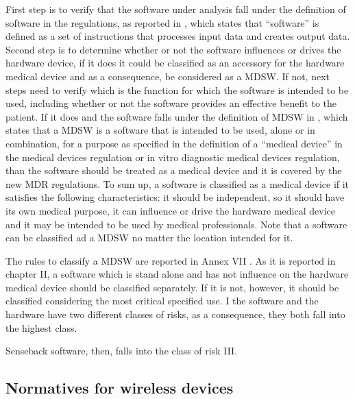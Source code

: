 \documentclass{Configuration_Files/PoliMi3i_thesis}
\begin{document}
First step is to verify that the software under analysis fall under the definition of software in the regulations, as reported in \cite{PublicHealthEuropean2024}, which states that “software” is defined as a set of instructions that processes input data and creates output data. Second step is to determine whether or not the software influences or drives the hardware device, if it does it could be classified as an accessory for the hardware medical device and as a consequence, be considered as a MDSW. If not, next steps need to verify which is the function for which the software is intended to be used, including whether or not the software provides an effective benefit to the patient. If it does and the software falls under the definition of MDSW in \cite{PublicHealthEuropean2024}, which states that a MDSW is a software that is intended to be used, alone or in combination, for a purpose as specified in the definition of a “medical device” in the medical devices regulation or in vitro diagnostic medical devices regulation, than the software should be treated as a medical device and it is covered by the new MDR regulations.
To sum up, a software is classified as a medical device if it satisfies the following characteristics: it should be independent, so it should have its own medical purpose, it can influence or drive the hardware medical device and it may be intended to be used by medical professionals. Note that a software can be classified ad a MDSW no matter the location intended for it.

The rules to classify a MDSW are reported in Annex VII \cite{massimopANNEXVIII2019}. As it is reported in chapter II, a software which is stand alone and has not influence on the hardware medical device should be classified separately. If it is not, however, it should be classified considering the most critical specified use. I the software and the hardware have two different classes of risks, as a consequence, they both fall into the highest class.

Senseback software, then, falls into the class of risk III. 

\subsection{Normatives for wireless devices}
\end{document}
